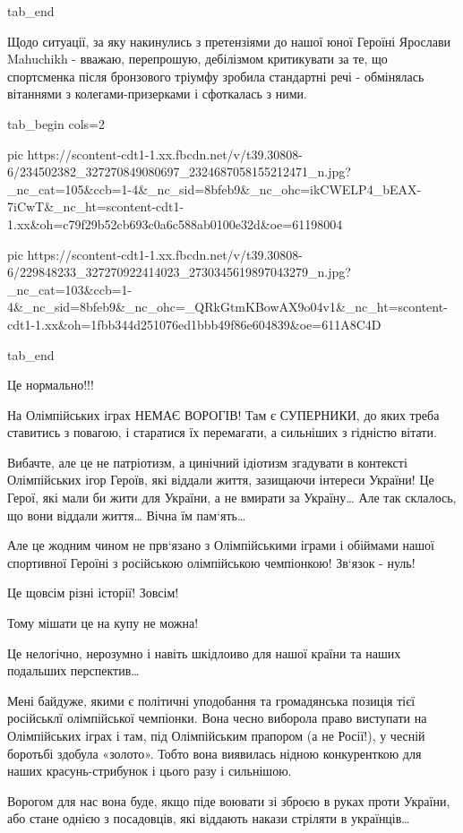  tab_end
\fi

Щодо ситуації, за яку накинулись з претензіями до нашої юної Героїні Ярослави
Mahuchikh - вважаю, перепрошую, дебілізмом критикувати за те, що спортсменка
після бронзового тріумфу зробила стандартні речі - обмінялась вітаннями з
колегами-призерками і сфоткалась з ними.


\ifcmt
  tab_begin cols=2

     pic https://scontent-cdt1-1.xx.fbcdn.net/v/t39.30808-6/234502382_327270849080697_2324687058155212471_n.jpg?_nc_cat=105&ccb=1-4&_nc_sid=8bfeb9&_nc_ohc=ikCWELP4_bEAX-7iCwT&_nc_ht=scontent-cdt1-1.xx&oh=c79f29b52cb693c0a6c588ab0100e32d&oe=61198004

     pic https://scontent-cdt1-1.xx.fbcdn.net/v/t39.30808-6/229848233_327270922414023_2730345619897043279_n.jpg?_nc_cat=103&ccb=1-4&_nc_sid=8bfeb9&_nc_ohc=_QRkGtmKBowAX9o04v1&_nc_ht=scontent-cdt1-1.xx&oh=1fbb344d251076ed1bbb49f86e604839&oe=611A8C4D

  tab_end
\fi


Це нормально!!!

На Олімпійських іграх НЕМАЄ ВОРОГІВ! Там є СУПЕРНИКИ, до яких треба ставитись з
повагою, і старатися їх перемагати, а сильніших з гідністю вітати.

Вибачте, але це не патріотизм, а цинічний ідіотизм згадувати в контексті
Олімпійських ігор Героїв, які віддали життя, зазищаючи інтереси України! Це
Герої, які мали би жити для України, а не вмирати за Україну… Але так склалось,
що вони віддали життя… Вічна їм пам‘ять…

Але це жодним чином не прв‘язано з Олімпійськими іграми і обіймами нашої
спортивної Героїні з російською олімпійською чемпіонкою! Зв‘язок - нуль!

Це щовсім різні історії! Зовсім!

Тому мішати це на купу не можна!

Це нелогічно, нерозумно і навіть шкідлоиво для нашої країни та наших подальших
перспектив…

Мені байдуже, якими є політичні уподобання та громадянська позиція тієї
російськлї олімпійської чемпіонки. Вона чесно виборола право виступати на
Олімпійських іграх і там, під Олімпійським прапором (а не Росії!), у чесній
боротьбі здобула «золото». Тобто вона виявилась нідною конкуренткою для наших
красунь-стрибунок і цього разу і сильнішою.

Ворогом для нас вона буде, якщо піде воювати зі зброєю в руках проти України,
або стане однією з посадовців, які віддають накази стріляти в українців…

